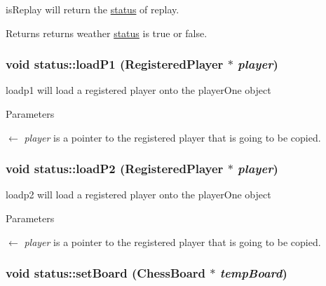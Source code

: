 isReplay will return the \hyperlink{classstatus}{status} of replay. \begin{DoxyReturn}{Returns}
returns weather \hyperlink{classstatus}{status} is true or false. 
\end{DoxyReturn}
\hypertarget{classstatus_a350710a41204ec7fc5691e534145118e}{
\subsubsection[{loadP1}]{\setlength{\rightskip}{0pt plus 5cm}void status::loadP1 ({\bf RegisteredPlayer} $\ast$ {\em player})}}
\label{classstatus_a350710a41204ec7fc5691e534145118e}


loadp1 will load a registered player onto the playerOne object 
\begin{DoxyParams}{Parameters}
\item[\mbox{$\leftarrow$} {\em player}]is a pointer to the registered player that is going to be copied. \end{DoxyParams}
\hypertarget{classstatus_a09a2400aaa57b5955c3ce2987a49dcbe}{
\subsubsection[{loadP2}]{\setlength{\rightskip}{0pt plus 5cm}void status::loadP2 ({\bf RegisteredPlayer} $\ast$ {\em player})}}
\label{classstatus_a09a2400aaa57b5955c3ce2987a49dcbe}


loadp2 will load a registered player onto the playerOne object 
\begin{DoxyParams}{Parameters}
\item[\mbox{$\leftarrow$} {\em player}]is a pointer to the registered player that is going to be copied. \end{DoxyParams}
\hypertarget{classstatus_a19b60728812778c97551d46403fc24bb}{
\subsubsection[{setBoard}]{\setlength{\rightskip}{0pt plus 5cm}void status::setBoard ({\bf ChessBoard} $\ast$ {\em tempBoard})}}
\label{classstatus_a19b60728812778c97551d46403fc24bb}


